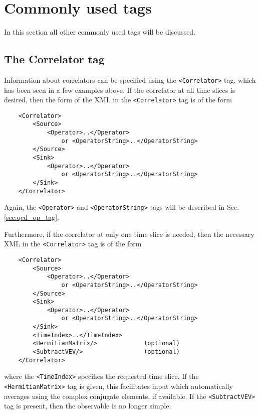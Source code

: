 \documentclass[12pt,notitlepage,letterpaper]{article}
\newcommand{\vb}{\texttt}
\begin{document}
\section{Commonly used tags}

In this section all other commonly used tags will be discussed.

\subsection{The Correlator tag}

Information about correlators can be specified using the
\vb{<Correlator>} tag, which has been seen in a few examples above.
If the correlator at all time slices is desired, then the
form of the XML in the \vb{<Correlator>} tag is of the form
\begin{verbatim}
    <Correlator>
        <Source>
            <Operator>..</Operator>
                or <OperatorString>..</OperatorString>
        </Source>
        <Sink>
            <Operator>..</Operator>
                or <OperatorString>..</OperatorString>
        </Sink>
    </Correlator>
\end{verbatim}
Again, the \vb{<Operator>} and \vb{<OperatorString>} tags
will be described in Sec. \ref{sec:qcd_op_tag}.

Furthermore, if the correlator at only one time slice is needed,
then the necessary XML in the \vb{<Correlator>} tag is of the form
\begin{verbatim}
    <Correlator>
        <Source>
            <Operator>..</Operator>
                or <OperatorString>..</OperatorString>
        </Source>
        <Sink>
            <Operator>..</Operator>
                or <OperatorString>..</OperatorString>
        </Sink>
        <TimeIndex>..</TimeIndex>
        <HermitianMatrix/>             (optional)
        <SubtractVEV/>                 (optional)
    </Correlator>
\end{verbatim}
where the \vb{<TimeIndex>} specifies the requested time slice.
If the \vb{<HermitianMatrix>} tag is given, this facilitates
input which automatically averages using the complex conjugate
elements, if available. If the \vb{<SubtractVEV>} tag is present,
then the observable is no longer simple.
\end{document}
